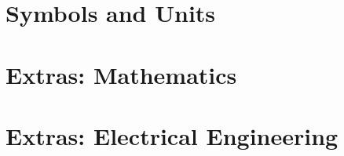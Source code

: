 \documentclass{article}
\begin{document}
    {  }

\newpage
\section{Symbols and Units}
\label{sec:units}

    {  }

\newpage
{}

\newpage
\section{Extras: Mathematics}%
\label{sec:extrasec-math}

    {  }

\newpage
\section{Extras: Electrical Engineering}%
\label{sec:extrasec-ee}

    {  }
\end{document}
